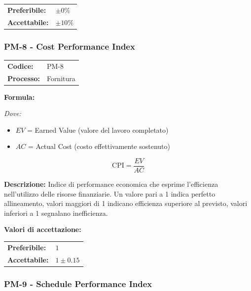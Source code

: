 \documentclass[a4paper,11pt,oneside]{scrartcl}
\begin{document}
\noindent
\begin{tabular}{@{}ll@{}}
    \textbf{Preferibile:} & $\pm 0\%$  \\
    \textbf{Accettabile:} & $\pm 10\%$ \\
\end{tabular}

\subsubsection{PM-8 - Cost Performance Index}
 
\noindent
\begin{tabular}{@{}p{}p{}@{}}
    \textbf{Codice:}   & PM-8      \\
    \textbf{Processo:} & Fornitura \\
\end{tabular}

\vspace{0.3cm}
\noindent\textbf{Formula:}

\noindent\textit{Dove:}
\begin{itemize}[leftmargin=1.5cm, topsep=0pt, itemsep=0pt]
    \item $EV$ = Earned Value (valore del lavoro completato)
    \item $AC$ = Actual Cost (costo effettivamente sostenuto)
\end{itemize}

\[
    \text{CPI} = \frac{EV}{AC}
\]

\noindent\textbf{Descrizione:} Indice di performance economica che esprime l'efficienza nell'utilizzo delle risorse finanziarie. Un valore pari a 1 indica perfetto allineamento, valori maggiori di 1 indicano efficienza superiore al previsto, valori inferiori a 1 segnalano inefficienza.

\vspace{0.2cm}
\noindent\textbf{Valori di accettazione:}
\vspace{0.1cm}

\noindent
\begin{tabular}{@{}ll@{}}
    \textbf{Preferibile:} & $1$          \\
    \textbf{Accettabile:} & $1 \pm 0.15$ \\
\end{tabular}

\subsubsection{PM-9 - Schedule Performance Index}
\end{document}
